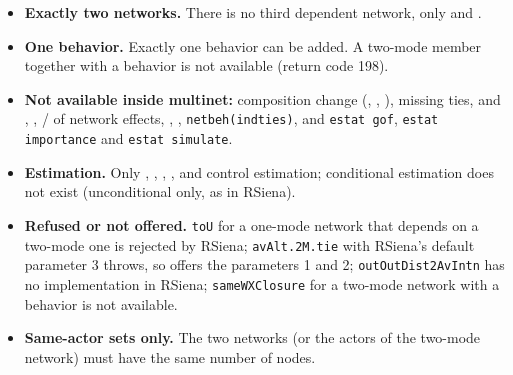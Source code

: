 \begin{itemize}
\item \textbf{Exactly two networks.} There is no third dependent network, only  and .
\item \textbf{One behavior.} Exactly one behavior can be added. A two-mode member together with a behavior is not available (return code 198).
\item \textbf{Not available inside multinet:} composition change (, , ), missing ties,  and , , / of network effects, , , \texttt{netbeh(indties)}, and \texttt{estat gof}, \texttt{estat importance} and \texttt{estat simulate}.
\item \textbf{Estimation.} Only , , , ,  and  control estimation; conditional estimation does not exist (unconditional only, as in RSiena).
\item \textbf{Refused or not offered.} \texttt{toU} for a one-mode network that depends on a two-mode one is rejected by RSiena; \texttt{avAlt.2M.tie} with RSiena's default parameter 3 throws, so \nwsaom{} offers the parameters 1 and 2; \texttt{outOutDist2AvIntn} has no implementation in RSiena; \texttt{sameWXClosure} for a two-mode network with a behavior is not available.
\item \textbf{Same-actor sets only.} The two networks (or the actors of the two-mode network) must have the same number of nodes.
\end{itemize}
\endgroup
